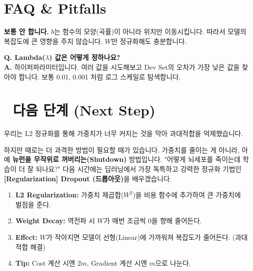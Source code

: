 \documentclass[11pt,a4paper]{book}
\theoremstyle{definition}
\begin{document}
\section{FAQ \& Pitfalls}

\begin{warningbox}[title={편향(Bias) $b$는 정규화 안 하나요?}]
\textbf{보통 안 합니다.}
$b$는 함수의 모양(곡률)이 아니라 위치만 이동시킵니다. 따라서 모델의 복잡도에 큰 영향을 주지 않습니다. $W$만 정규화해도 충분합니다.
\end{warningbox}

\textbf{Q. Lambda($\lambda$) 값은 어떻게 정하나요?} \\
\textbf{A.} 하이퍼파라미터입니다. 여러 값을 시도해보고 Dev Set의 오차가 가장 낮은 값을 찾아야 합니다. 보통 0.01, 0.001 처럼 로그 스케일로 탐색합니다.

\section*{🔗 다음 단계 (Next Step)}
우리는 L2 정규화를 통해 가중치가 너무 커지는 것을 막아 과대적합을 억제했습니다.

하지만 때로는 더 과격한 방법이 필요할 때가 있습니다. 가중치를 줄이는 게 아니라, 아예 \textbf{뉴런을 무작위로 꺼버리는(Shutdown)} 방법입니다. "어떻게 뇌세포를 죽이는데 학습이 더 잘 되나요?"
다음 시간에는 딥러닝에서 가장 독특하고 강력한 정규화 기법인 \textbf{[Regularization] Dropout (드롭아웃)}을 배우겠습니다.

\vspace{0.5cm}

\begin{summarybox}[title={단원 요약 (Cheat Sheet)}]
\begin{enumerate}
    \item \textbf{L2 Regularization:} 가중치 제곱합($W^2$)을 비용 함수에 추가하여 큰 가중치에 벌점을 준다.
    \item \textbf{Weight Decay:} 역전파 시 $W$가 매번 조금씩 0을 향해 줄어든다.
    \item \textbf{Effect:} $W$가 작아지면 모델이 선형(Linear)에 가까워져 복잡도가 줄어든다. (과대적합 해결)
    \item \textbf{Tip:} Cost 계산 시엔 $2m$, Gradient 계산 시엔 $m$으로 나눈다.
\end{enumerate}
\end{summarybox}


\end{document}

